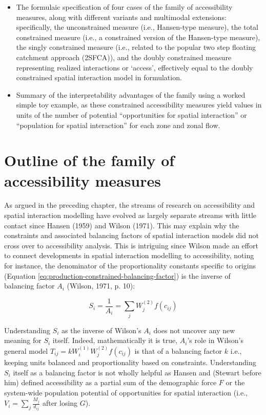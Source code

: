 \documentclass[
11pt, %
oneside, %
english, %
singlespacing, %
]{macthesis} %
\def\tightlist{}
\begin{document}
\begin{itemize}
\tightlist
\item
  The formulaic specification of four cases of the family of accessibility measures, along with different variants and multimodal extensions: specifically, the unconstrained measure (i.e., Hansen-type measure), the total constrained measure (i.e., a constrained version of the Hansen-type measure), the singly constrained measure (i.e., related to the popular two step floating catchment approach (2SFCA)), and the doubly constrained measure representing realized interactions or `access', effectively equal to the doubly constrained spatial interaction model in formulation.
\item
  Summary of the interpretability advantages of the family using a worked simple toy example, as these constrained accessibility measures yield values in units of the number of potential ``opportunities for spatial interaction'' or ``population for spatial interaction'' for each zone and zonal flow.
\end{itemize}

\section{Outline of the family of accessibility measures}\label{outline-of-the-family-of-accessibility-measures}

As argued in the preceding chapter, the streams of research on accessibility and spatial interaction modelling have evolved as largely separate streams with little contact since Hansen (1959) and Wilson (1971). This may explain why the constraints and associated balancing factors of spatial interaction models did not cross over to accessibility analysis. This is intriguing since Wilson made an effort to connect developments in spatial interaction modelling to accessibility, noting for instance, the denominator of the proportionality constants specific to origins (Equation \ref{eq:production-constrained-balancing-factor}) is the inverse of balancing factor \(A_i\) (Wilson, 1971, p. 10):

\begin{equation}
\label{eq:Ai-as-accessibility}
S_i = \frac{1}{A_i} = \sum_j W_j^{(2)} f(c_{ij})
\end{equation} 

Understanding \(S_i\) as the inverse of Wilson's \(A_i\) does not uncover any new meaning for \(S_i\) itself. Indeed, mathematically it is true, \(A_i\)'s role in Wilson's general model \(T_{ij} = k W_i^{(1)} W_j^{(2)} f(c_{ij})\) is that of a balancing factor \(k\) i.e., keeping units balanced and proportionality based on constraints. Understanding \(S_i\) itself as a balancing factor is not wholly helpful as Hansen and (Stewart before him) defined accessibility as a partial sum of the demographic force \(F\) or the system-wide population potential of opportunities for spatial interaction (i.e., \(V_i = \sum_j \frac{M_j}{d_{ij}}\) after losing \(G\)).
\end{document}
